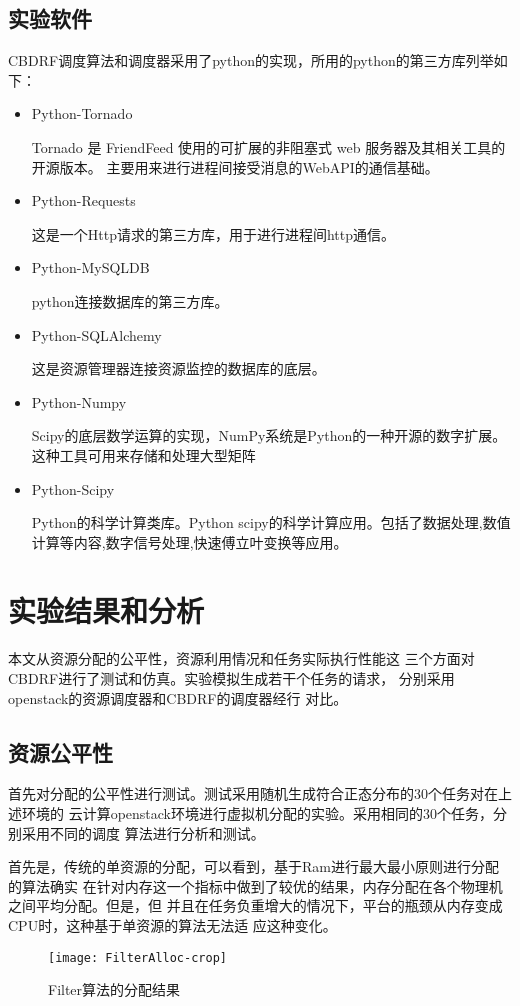 \subsection{实验软件}
CBDRF调度算法和调度器采用了python的实现，所用的python的第三方库列举如下：
\begin{itemize}
\item Python-Tornado 

Tornado 是 FriendFeed 使用的可扩展的非阻塞式 web 服务器及其相关工具的开源版本。
主要用来进行进程间接受消息的WebAPI的通信基础。
\item Python-Requests 

这是一个Http请求的第三方库，用于进行进程间http通信。
\item Python-MySQLDB  

python连接数据库的第三方库。
\item Python-SQLAlchemy 

这是资源管理器连接资源监控的数据库的底层。
\item Python-Numpy 

Scipy的底层数学运算的实现，NumPy系统是Python的一种开源的数字扩展。这种工具可用来存储和处理大型矩阵
\item Python-Scipy 

Python的科学计算类库。Python scipy的科学计算应用。包括了数据处理,数值计算等内容,数字信号处理,快速傅立叶变换等应用。
\end{itemize}


\section{实验结果和分析}
本文从资源分配的公平性，资源利用情况和任务实际执行性能这
三个方面对CBDRF进行了测试和仿真。实验模拟生成若干个任务的请求，
分别采用openstack的资源调度器和CBDRF的调度器经行
对比。
\subsection{资源公平性}
首先对分配的公平性进行测试。测试采用随机生成符合正态分布的30个任务对在上述环境的
云计算openstack环境进行虚拟机分配的实验。采用相同的30个任务，分别采用不同的调度
算法进行分析和测试。

首先是，传统的单资源的分配，可以看到，基于Ram进行最大最小原则进行分配的算法确实
在针对内存这一个指标中做到了较优的结果，内存分配在各个物理机之间平均分配。但是，但
并且在任务负重增大的情况下，平台的瓶颈从内存变成CPU时，这种基于单资源的算法无法适
应这种变化。
\begin{figure}[htbp]
\centering\texttt{[image: FilterAlloc-crop]}
\caption{Filter算法的分配结果}\label{fig:FilterAlloc}
\end{figure}

